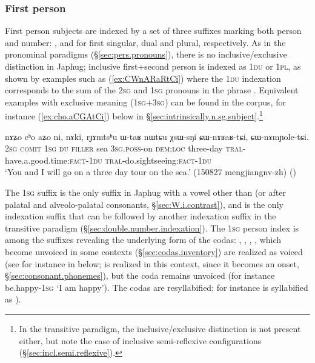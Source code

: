 \subsubsection{First person} \label{sec:intr.1}
First person subjects are indexed by a set of three suffixes marking both person and number: ,  and  for first singular, dual and plural, respectively. As in the pronominal paradigms (§\ref{sec:pers.pronouns}), there is no inclusive/exclusive distinction in Japhug; inclusive first+second person is indexed as \textsc{1du} or \textsc{1pl}, as shown by examples such as (\ref{ex:CWnARaRtCi}) where the \textsc{1du} indexation corresponds to the sum of the \textsc{2sg} and \textsc{1sg} pronouns in the phrase . Equivalent examples with exclusive meaning (\textsc{1sg}+\textsc{3sg}) can be found in the corpus, for instance (\ref{ex:cho.aCGAtCi}) below in §\ref{sec:intrinsically.n.sg.subject}.\footnote{In the transitive paradigm, the inclusive/exclusive distinction is not present either, but note the case of inclusive semi-reflex\-ive configurations (§\ref{sec:incl.semi.reflexive}).
}

\begin{exe}
\ex \label{ex:CWnARaRtCi}
\gll  nɤʑo cʰo aʑo ni, nɤki, rɟɤmtsʰu ɯ-taʁ nɯtɕu χsɯ-sŋi ɕɯ-nɤʁaʁ-tɕi, ɕɯ-nɤmɲole-tɕi. \\
\textsc{2sg} \textsc{comit} \textsc{1sg} \textsc{du} \textsc{filler} sea \textsc{3sg}.\textsc{poss}-on \textsc{dem}:\textsc{loc} three-day \textsc{tral}-have.a.good.time:\textsc{fact}-\textsc{1du} \textsc{tral}-do.sightseeing:\textsc{fact}-\textsc{1du} \\
\glt `You and I will go on a three day tour on the sea.' (150827 mengjiangnv-zh)
()
\end{exe}

The \textsc{1sg}  suffix is the only suffix in Japhug with a vowel other than  (or  after palatal and alveolo-palatal consonants, §\ref{sec:W.i.contrast}), and is the only indexation suffix that can be followed by another indexation suffix in the transitive paradigm (§\ref{sec:double.number.indexation}). The  \textsc{1sg} person index is among the suffixes revealing the underlying form of the codas: , , , , which become unvoiced in some contexts (§\ref{sec:codas.inventory}) are realized as voiced (see for instance in  below;  is realized  in this context, since it becomes an onset, §\ref{sec:consonant.phonemes}), but the coda  remains unvoiced (for instance  be.happy-\textsc{1sg} `I am happy'). The codas are resyllabified; for instance  is syllabified as ).

